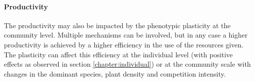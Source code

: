 
\paragraph{Productivity}

The productivity may also be impacted by the phenotypic plasticity at the community level. Multiple mechanisms can be involved, but in any case a higher productivity is achieved by a higher efficiency in the use of the resources given. The plasticity can affect this efficiency at the individual level (with positive effects as observed in section \ref{chapter:individual}) or at the community scale with changes in the dominant species, plant density and competition intensity.

